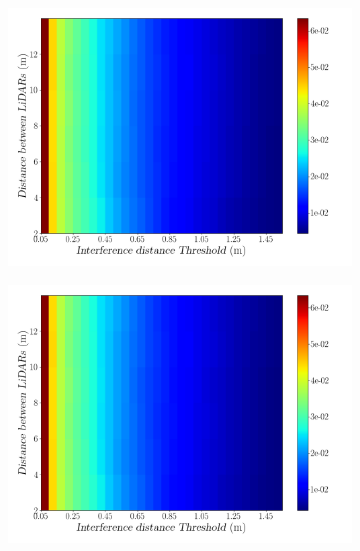 \begin{figure}[!ht]
\centering
\begin{subfigure}[c]{0.45\textwidth}
	\includegraphics[width=\textwidth]{img/lidar-interference/LOS/interference_distance_color_mesh.png}
\caption{}%
	\label{fig:los:interference-color-mesh}
\end{subfigure}
\qquad
\begin{subfigure}[c]{0.45\textwidth}
	\includegraphics[width=\textwidth]{img/lidar-interference/LOS/ground_truth_distance_color_mesh.png}
\caption{}%

\end{subfigure}
\end{figure}
